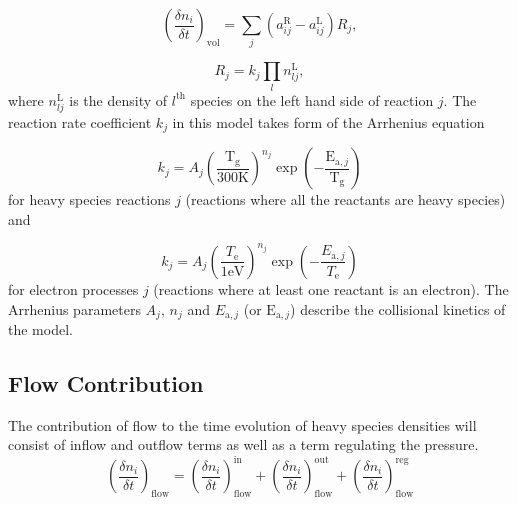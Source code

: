 \begin{equation}
    \left( \frac{\delta n_{i}}{\delta t} \right)_{\mathrm{vol}} =
    \sum_{j} (a_{ij}^{\mathrm{R}} - a_{ij}^{\mathrm{L}}) R_{j},
\end{equation}

\begin{equation}
    R_{j} = k_{j} \prod_{l} n_{lj}^{\mathrm{L}},
    \label{eq:03-react-rate}
\end{equation}
where $n_{lj}^{\mathrm{L}}$ is the density of $l^{\mathrm{th}}$ species on the left hand side of reaction $j$.
The reaction rate coefficient $k_{j}$ in this model takes form of the Arrhenius equation

\begin{equation}
    k_{j} =
    A_{j} \left( \frac{\mathrm{T}_{\mathrm{g}}}{300 \mathrm{K}} \right)^{n_{j}}
    \exp \left( - \frac{\mathrm{E}_{\mathrm{a}, j}}{\mathrm{T}_{\mathrm{g}}} \right)
    \label{eq:03-arrh-1}
\end{equation}
for heavy species reactions $j$ (reactions where all the reactants are heavy species) and

\begin{equation}
    k_{j} = A_{j}
    \left( \frac{T_{\mathrm{e}}}{1 \mathrm{eV}} \right)^{n_{j}}
    \exp \left( - \frac{E_{\mathrm{a}, j}}{T_{\mathrm{e}}} \right)
    \label{eq:03-arrh-2}
\end{equation}
for electron processes $j$ (reactions where at least one reactant is an electron).
The Arrhenius parameters $A_{j}$, $n_{j}$ and $E_{\mathrm{a}, j}$ (or $\mathrm{E}_{\mathrm{a}, j}$) describe the
collisional kinetics of the model.

\subsection{Flow Contribution}\label{subsec:03-flow-contribution}
The contribution of flow to the time evolution of heavy species densities will consist of inflow and outflow terms as
well as a term regulating the pressure.
\begin{equation}
    \left( \frac{\delta n_{i}}{\delta t} \right)_{\mathrm{flow}} =
    \left( \frac{\delta n_{i}}{\delta t} \right)_{\mathrm{flow}} ^{\mathrm{in}} +
    \left( \frac{\delta n_{i}}{\delta t} \right)_{\mathrm{flow}} ^{\mathrm{out}} +
    \left( \frac{\delta n_{i}}{\delta t} \right)_{\mathrm{flow}} ^{\mathrm{reg}}
\end{equation}

